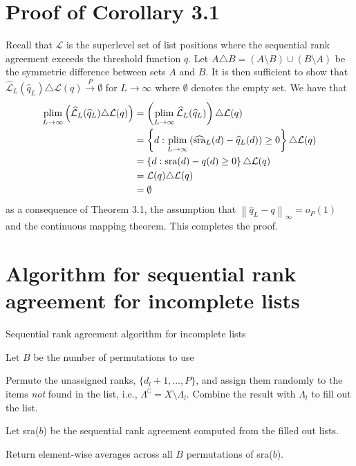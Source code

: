 \documentclass[oupdraft]{bio}
\newcommand{\nn}{\nonumber}
\newcommand{\plim}{\operatornamewithlimits{plim}}
\begin{document}
\section{Proof of Corollary 3.1}
\label{sec:appB}
Recall that $\mathcal{L}$ is the superlevel set of list positions
where the sequential rank agreement exceeds the threshold function
$q$. Let $A \triangle B = (A \setminus B) \cup (B \setminus A)$ be the
symmetric difference between sets $A$ and $B$. It is then sufficient
to show that $\widehat{\mathcal{L}}_L(\widehat{q}_L) \triangle \mathcal{L}(q) \overset{P}{\longrightarrow} \emptyset$
for $L \rightarrow \infty$ where $\emptyset$ denotes the empty set.
We have that
\begin{align}
  \plim_{L \rightarrow \infty}\left(\widehat{\mathcal{L}}_L(\widehat{q}_L) \triangle \mathcal{L}(q)\right) &=   \left(\plim_{L \rightarrow \infty}\widehat{\mathcal{L}}_L(\widehat{q}_L)\right) \triangle \mathcal{L}(q)\\
  &= \left\{d : \plim_{L\rightarrow \infty} \left(\widehat{\textrm{sra}}_L(d) - \widehat{q}_L(d)\right)\geq 0\right\} \triangle \mathcal{L}(q)\nn\\
  &= \left\{d : \textrm{sra}(d) - q(d) \geq 0\right\}\triangle \mathcal{L}(q)\nn\\
  &= \mathcal{L}(q)\triangle \mathcal{L}(q)\nn\\
  &= \emptyset\nn
\end{align}
as a consequence of Theorem 3.1, the assumption that $\left\|\widehat{q}_L - q\right\|_\infty = o_P(1)$ and the continuous mapping theorem. This completes the proof.


\section{Algorithm for sequential rank agreement for incomplete lists}
\label{sec:appA}



\begin{algorithm}
\caption{Sequential rank agreement algorithm for incomplete lists}
\label{sra-algorithm}
\begin{algorithmic}[1]
   \State Let $B$ be the number
  of permutations to use  
  \State \parbox[t]{\dimexpr\linewidth-\algorithmicindent-1.7cm}{Permute
    the unassigned ranks, $\{d_l+1, \ldots, P\}$, and assign them
    randomly to the items \emph{not} found in the list, i.e.,
    $\Lambda^\complement=X\setminus\Lambda_l$. Combine the
    result with $\Lambda_l$ to fill out the list.}
\EndFor
\State \parbox[t]{\dimexpr\linewidth-\algorithmicindent-1cm}{Let sra($b$) be the sequential rank agreement computed from the
filled out lists.}
\EndFor
\State Return element-wise averages across all $B$ permutations of sra($b$).
\EndProcedure
\end{algorithmic}
\end{algorithm}
\end{document}
